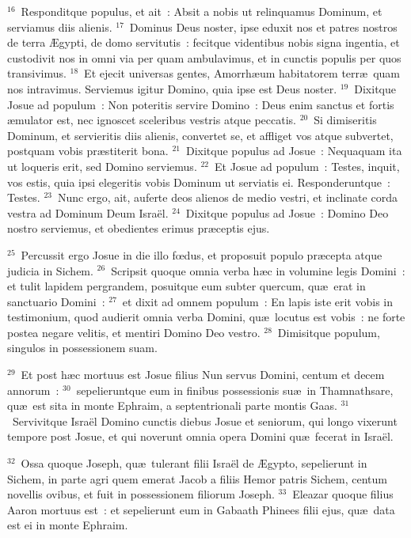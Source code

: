 ${}^{16}$~Responditque populus, et ait~: Absit a nobis ut relinquamus Dominum, et serviamus diis alienis.
${}^{17}$~Dominus Deus noster, ipse eduxit nos et patres nostros de terra \AE gypti, de domo servitutis~: fecitque videntibus nobis signa ingentia, et custodivit nos in omni via per quam ambulavimus, et in cunctis populis per quos transivimus.
${}^{18}$~Et ejecit universas gentes, Amorrh\ae um habitatorem terr\ae\ quam nos intravimus. Serviemus igitur Domino, quia ipse est Deus noster.
${}^{19}$~Dixitque Josue ad populum~: Non poteritis servire Domino~: Deus enim sanctus et fortis \ae mulator est, nec ignoscet sceleribus vestris atque peccatis.
${}^{20}$~Si dimiseritis Dominum, et servieritis diis alienis, convertet se, et affliget vos atque subvertet, postquam vobis pr\ae stiterit bona.
${}^{21}$~Dixitque populus ad Josue~: Nequaquam ita ut loqueris erit, sed Domino serviemus.
${}^{22}$~Et Josue ad populum~: Testes, inquit, vos estis, quia ipsi elegeritis vobis Dominum ut serviatis ei. Responderuntque~: Testes.
${}^{23}$~Nunc ergo, ait, auferte deos alienos de medio vestri, et inclinate corda vestra ad Dominum Deum Isra\"el.
${}^{24}$~Dixitque populus ad Josue~: Domino Deo nostro serviemus, et obedientes erimus pr\ae ceptis ejus.


${}^{25}$~Percussit ergo Josue in die illo fœdus, et proposuit populo pr\ae cepta atque judicia in Sichem.
${}^{26}$~Scripsit quoque omnia verba h\ae c in volumine legis Domini~: et tulit lapidem pergrandem, posuitque eum subter quercum, qu\ae\ erat in sanctuario Domini~:
${}^{27}$~et dixit ad omnem populum~: En lapis iste erit vobis in testimonium, quod audierit omnia verba Domini, qu\ae\ locutus est vobis~: ne forte postea negare velitis, et mentiri Domino Deo vestro.
${}^{28}$~Dimisitque populum, singulos in possessionem suam.


${}^{29}$~Et post h\ae c mortuus est Josue filius Nun servus Domini, centum et decem annorum~:
${}^{30}$~sepelieruntque eum in finibus possessionis su\ae\ in Thamnathsare, qu\ae\ est sita in monte Ephraim, a septentrionali parte montis Gaas.
${}^{31}$~Servivitque Isra\"el Domino cunctis diebus Josue et seniorum, qui longo vixerunt tempore post Josue, et qui noverunt omnia opera Domini qu\ae\ fecerat in Isra\"el.


${}^{32}$~Ossa quoque Joseph, qu\ae\ tulerant filii Isra\"el de \AE gypto, sepelierunt in Sichem, in parte agri quem emerat Jacob a filiis Hemor patris Sichem, centum novellis ovibus, et fuit in possessionem filiorum Joseph.
${}^{33}$~Eleazar quoque filius Aaron mortuus est~: et sepelierunt eum in Gabaath Phinees filii ejus, qu\ae\ data est ei in monte Ephraim.
